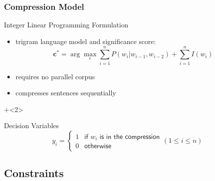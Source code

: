 \documentclass{beamer}
\begin{document}
\begin{frame}
  \frametitle{Compression Model}
  \begin{block}{Integer Linear Programming Formulation}
    \begin{itemize}
    \item trigram language model and significance score:
      \begin{displaymath}
        \mathbf{c}^* = \arg\!\max_c \sum_{i=1}^n P(w_i|w_{i-1}, w_{i-2}) + \sum_{i=1}^n I(w_i)        
      \end{displaymath}
    \item requires \alert{no parallel corpus}
    \item compresses sentences sequentially
    \end{itemize}
  \end{block}
\onslide+<2>{
  \begin{block}{Decision Variables}
    \begin{displaymath}
      y_i = \left\{ \begin{array}{ll}
          1 & \textsf{if $w_i$ is in the compression}\\
          0 & \textsf{otherwise}
        \end{array} \right.  (1 \leq i \leq n)
    \end{displaymath}
  \end{block}
}
\end{frame}



\subsection{Constraints}
\end{document}
